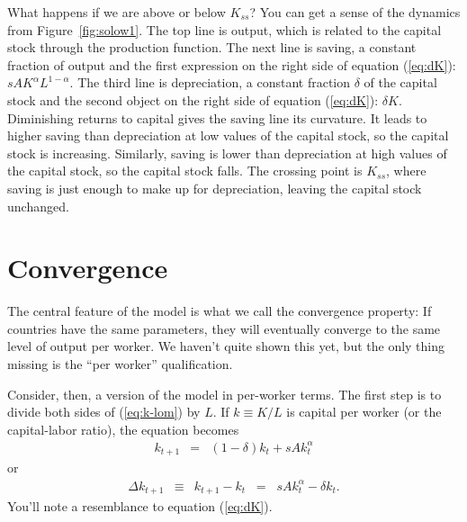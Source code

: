 What happens if we are above or below $K_{ss}$?
You can get a sense of the dynamics from Figure~\ref{fig:solow1}.
The top line is output,
which is related to the capital stock through the production function.
The next line is saving, a constant fraction of output
and the first expression on the right side of equation (\ref{eq:dK}):  $s A K^\alpha L^{1-\alpha} $.
The third line is depreciation, a constant fraction $\delta$
of the capital stock and the second object on the right side of equation (\ref{eq:dK}):  $\delta K $.
Diminishing returns to capital gives the saving line its curvature.
It leads to higher saving than depreciation at low
values of the capital stock, so the capital stock is increasing.
Similarly, saving is lower than depreciation at high values of the capital stock,
so the capital stock falls.
The crossing point is $K_{ss}$, where saving is just enough to
make up for depreciation, leaving the capital stock unchanged.


\section{Convergence}

The central feature of the model is what we call the convergence property:
If countries have the same parameters, they will eventually converge to the same
level of output per worker.
We haven't quite shown this yet, but the only thing missing
is the ``per worker'' qualification.


Consider, then, a version of the model in per-worker terms.
The first step is to divide both sides of (\ref{eq:k-lom}) by $L$.
If $k \equiv K/L$ is capital per worker (or the capital-labor ratio), the equation becomes
\begin{eqnarray*}
   k_{t+1} &=& (1-\delta) k_t + s A k_{t}^{\alpha}
\end{eqnarray*}
or
\begin{eqnarray}
   \Delta k_{t+1} &\equiv& k_{t+1} - k_t
            \;\;=\;\; s A k_{t}^{\alpha} - \delta k_t  .
   \label{eq:dk}
\end{eqnarray}
You'll note a resemblance to equation (\ref{eq:dK}).

